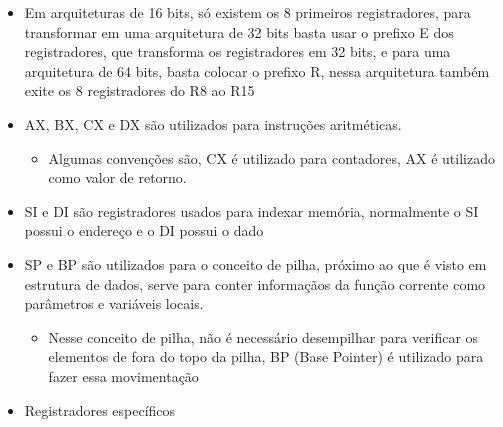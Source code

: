 \documentclass[12pt]{article}
\begin{document}
\begin{itemize}
\begin{itemize}
\begin{scriptsize}
            os de Propósito Especifico, não é possivel usar para coisas além 
            de leitura 
        \end{scriptsize}
        \begin{itemize}
            \item AX -- 16 bits
            \item BX -- 16 bits
            \item CX -- 16 bits
            \item DX -- 16 bits
            \item SI -- 16 bits
            \item DI -- 16 bits
            \item SP -- 16 bits
            \item BP -- 16 bits
            \item R8 -- R15
        \end{itemize}
        \item Em arquiteturas de 16 bits, só existem os 8 primeiros registradores, 
        para transformar em uma arquitetura de 32 bits basta usar o prefixo E  
        dos registradores, que transforma os registradores em 32 bits, e para 
        uma arquitetura de 64 bits, basta colocar o prefixo R, nessa arquitetura 
        também exite os 8 registradores do R8 ao R15
        \item AX, BX, CX e DX são utilizados para instruções 
        aritméticas.
        \begin{itemize}
            \item Algumas convenções são, CX é utilizado para contadores, AX é 
            utilizado como valor de retorno.
        \end{itemize}
        \item SI e DI são registradores usados para indexar memória, normalmente 
        o SI possui o endereço e o DI possui o dado
        \item SP e BP são utilizados para o conceito de pilha, próximo ao que é 
        visto em estrutura de dados, serve para conter informaçãos da função 
        corrente como parâmetros e variáveis locais.
        \begin{itemize}
            \item Nesse conceito de pilha, não é necessário desempilhar para 
            verificar os elementos de fora do topo da pilha, BP (Base Pointer) 
            é utilizado para fazer essa movimentação
        \end{itemize}
        \item Registradores específicos

\end{itemize}
\end{itemize}
\end{document}
